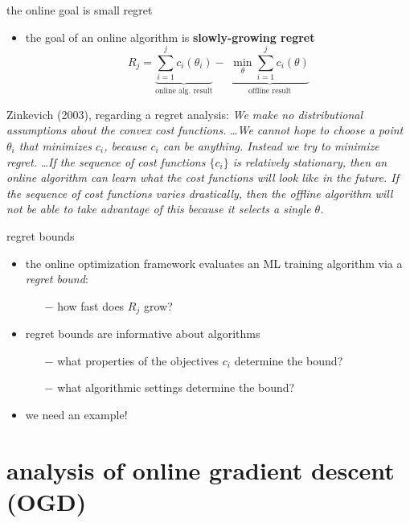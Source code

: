 \documentclass[xcolor={svgnames},
               hyperref={colorlinks,citecolor=DeepPink4,linkcolor=FireBrick,urlcolor=Maroon},
               usepdftitle=false]  %
               {beamer}
\begin{document}
\begin{frame}{the online goal is small regret}

\begin{itemize}
\item the goal of an online algorithm is \textbf{slowly-growing regret}
  $$R_j = \underbrace{\sum_{i=1}^j c_i(\theta_i)}_{\text{online alg.~result}} - \,\, \underbrace{\min_\theta \sum_{i=1}^j c_i(\theta)}_{\text{offline result}}$$
\end{itemize}

Zinkevich (2003), regarding a regret analysis:  \quad \emph{We make \alert{no distributional assumptions} about the convex cost functions.} \dots \emph{We cannot hope to choose a point $\theta_i$ that minimizes $c_i$, because $c_i$ can be anything. Instead we try to \alert{minimize regret}.} \dots \emph{If the sequence of cost functions $\{c_i\}$ is relatively stationary, then an online algorithm can learn what the cost functions will look like in the future.  If the sequence of cost functions varies drastically, then the offline algorithm will not be able to take advantage of this because it selects a single $\theta$.}

\end{frame}


\begin{frame}{regret bounds}

\begin{itemize}
\item the online optimization framework evaluates an ML training algorithm via a \emph{regret bound}:
    \begin{itemize}
    \item[$-$] how fast does $R_j$ grow?
    \end{itemize}
\item regret bounds are informative about algorithms
    \begin{itemize}
    \item[$-$] what properties of the objectives $c_i$ determine the bound?
    \item[$-$] what algorithmic settings determine the bound?
    \end{itemize}
\item we need an example!
\end{itemize}
\end{frame}


\section{analysis of online gradient descent (OGD)}
\end{document}
